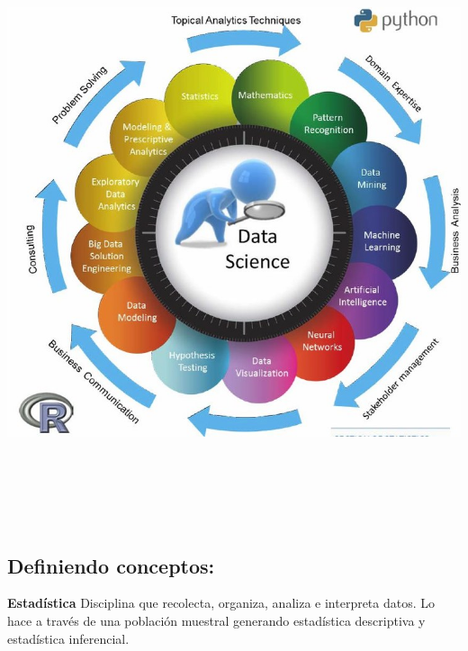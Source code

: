 \documentclass[
]{book}
\begin{document}
\begin{center}\includegraphics[width=500pt,height=500pt]{img/01-intro2ds/01_data-science-applications} \end{center}

\hypertarget{definiendo-conceptos}{%
\subsection*{Definiendo conceptos:}\label{definiendo-conceptos}}

\textbf{Estadística} Disciplina que recolecta, organiza, analiza e interpreta datos. Lo hace a través de una población muestral generando estadística descriptiva y estadística inferencial.
\end{document}
